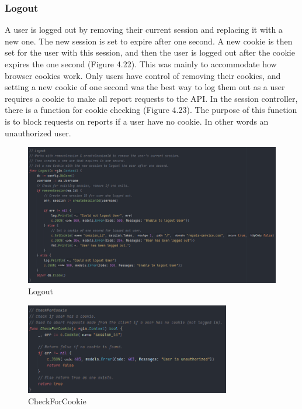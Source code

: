 \subsubsection{Logout}
A user is logged out by removing their current session and replacing it with a new one. The new session is set to expire after one second. A new cookie is then set for the user with this session, and then the user is logged out after the cookie expires the one second (Figure 4.22). This was mainly to accommodate how browser cookies work. Only users have control of removing their cookies, and setting a new cookie of one second was the best way to log them out as a user requires a cookie to make all report requests to the API. In the session controller, there is a function for cookie checking (Figure 4.23). The purpose of this function is to block requests on reports if a user have no cookie. In other words an unauthorized user.

\begin{figure}[H]
    \caption{Logout}
    \label{image:logout}
    \centering
    \includegraphics[width=1.0\textwidth]{images/horton/account_system/logout_func.png}
\end{figure}

\begin{figure}[H]
    \caption{CheckForCookie}
    \label{image:cookieCheck}
    \centering
    \includegraphics[width=0.8\textwidth]{images/horton/account_system/check_cookie.png}
\end{figure}

